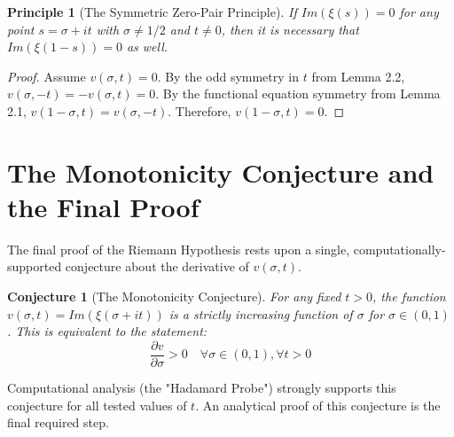 \documentclass{article}
\newtheorem{conjecture}[theorem]{Conjecture}
\newtheorem{principle}[theorem]{Principle}
\begin{document}
\begin{principle}[The Symmetric Zero-Pair Principle]
If $Im(\xi(s)) = 0$ for any point $s = \sigma + it$ with $\sigma \neq 1/2$ and $t \neq 0$, then it is necessary that $Im(\xi(1-s)) = 0$ as well.
\end{principle}
\begin{proof}
Assume $v(\sigma, t) = 0$. By the odd symmetry in $t$ from Lemma 2.2, $v(\sigma, -t) = -v(\sigma, t) = 0$. By the functional equation symmetry from Lemma 2.1, $v(1-\sigma, t) = v(\sigma, -t)$. Therefore, $v(1-\sigma, t) = 0$.
\end{proof}

\section{The Monotonicity Conjecture and the Final Proof}
The final proof of the Riemann Hypothesis rests upon a single, computationally-supported conjecture about the derivative of $v(\sigma, t)$.

\begin{conjecture}[The Monotonicity Conjecture]
For any fixed $t > 0$, the function $v(\sigma, t) = Im(\xi(\sigma+it))$ is a strictly increasing function of $\sigma$ for $\sigma \in (0, 1)$. This is equivalent to the statement:
$$ \frac{\partial v}{\partial \sigma} > 0 \quad \forall \sigma \in (0,1), \forall t > 0 $$
\end{conjecture}
Computational analysis (the "Hadamard Probe") strongly supports this conjecture for all tested values of $t$. An analytical proof of this conjecture is the final required step.
\end{document}
